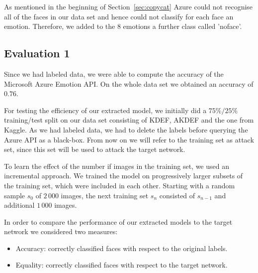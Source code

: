 \documentclass[a4paper,11pt]{article}
\begin{document}
       As mentioned in the beginning of Section~\ref{sec:copycat} Azure could not recognise all of the faces in our data set and hence could not classify for each face an emotion. Therefore, we added to the 8 emotions a further class called 'no\textunderscore face'.
        
        
    \subsection{Evaluation 1}
        Since we had labeled data, we were able to compute the accuracy of the Microsoft Azure Emotion API. On the whole data set we obtained an accuracy of $0.76$.
        
        For testing the efficiency of our extracted model, we initially did a $75\%/25\%$ training/test split on our data set consisting of KDEF, AKDEF and the one from Kaggle. As we had labeled data, we had to delete the labels before querying the Azure API as a black-box. From now on we will refer to the training set as attack set, since this set will be used to attack the target network.
        
        To learn the effect of the number if images in the training set, we used an incremental approach. We trained the model on progressively larger subsets of the training set, which were included in each other. Starting with a random sample $s_0$ of $2\,000$ images, the next training set $s_n$ consisted of $s_{n-1}$ and additional $1\,000$ images.
        
        In order to compare the performance of our extracted models to the target network we considered two measures:
        \begin{itemize}
            \item Accuracy: correctly classified faces with respect to the original labels.
            \item Equality: correctly classified faces with respect to the target network.  
        \end{itemize}
        
\end{document}

